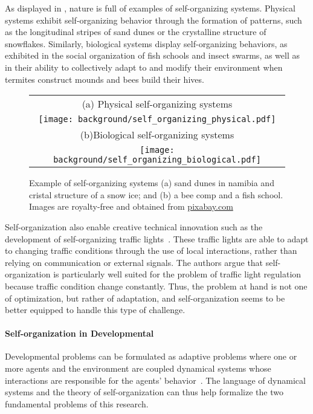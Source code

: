 As displayed in , nature is full of examples of self-organizing systems. Physical systems exhibit self-organizing behavior through the formation of patterns, such as the longitudinal stripes of sand dunes or the crystalline structure of snowflakes. Similarly, biological systems display self-organizing behaviors\citep{camazine2001self-organization}, as exhibited in the social organization of fish schools and insect swarms, as well as in their ability to collectively adapt to and modify their environment when termites construct mounds and bees build their hives.
%
\begin{figure}[!h]
\small
\centering
\begin{tabular}{c}
	(a) Physical self-organizing systems\\
	\texttt{[image: background/self\_organizing\_physical.pdf]}\\
	(b)Biological self-organizing systems\\
	\texttt{[image: background/self\_organizing\_biological.pdf]}
\end{tabular}
\caption{Example of self-organizing systems (a) sand dunes in namibia and cristal structure of a snow ice; and (b) a bee comp and a fish school. Images are royalty-free and obtained from \url{pixabay.com}}
\label{fig:example_self_org}	
\end{figure}

Self-organization also enable creative technical innovation such as the development of self-organizing traffic lights~\citep{ferreira2010self-organized}. These traffic lights are able to adapt to changing traffic conditions through the use of local interactions, rather than relying on communication or external signals. The authors argue that self-organization is particularly well suited for the problem of traffic light regulation because traffic condition change constantly. Thus, the problem at hand is not one of optimization, but rather of adaptation, and self-organization seems to be better equipped to handle this type of challenge.

\paragraph{Self-organization in Developmental \ai}

Developmental \ai problems can be formulated as adaptive problems where one or more agents and the environment are coupled dynamical systems whose interactions are responsible for the agents' behavior~\citep{beer1995dynamical}. The language of dynamical systems and the theory of self-organization can thus help formalize the two fundamental problems of this research.


